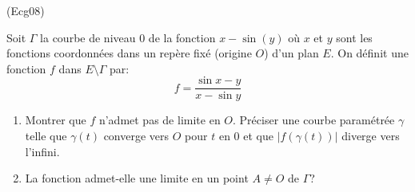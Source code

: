 \begin{tiny}(Ecg08)\end{tiny} Soit $\Gamma$ la courbe de niveau $0$ de la fonction $x-\sin(y)$ où $x$ et $y$ sont les fonctions coordonnées dans un repère fixé (origine $O$) d'un plan $E$. On définit une fonction $f$ dans $E\setminus \Gamma$ par:
\begin{displaymath}
 f= \frac{\sin x -y}{x- \sin y}
\end{displaymath}
 \begin{enumerate}
  \item Montrer que $f$ n'admet pas de limite en $O$. Préciser une courbe paramétrée $\gamma$ telle que $\gamma(t)$ converge vers $O$ pour $t$ en $0$ et que $|f(\gamma(t))|$ diverge vers l'infini.
  \item La fonction admet-elle une limite en un point $A\neq O$ de $\Gamma$?
 \end{enumerate}
